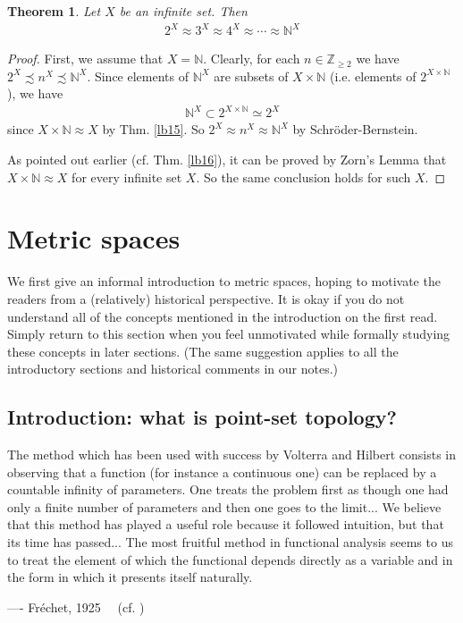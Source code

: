 \documentclass[12pt,b5paper,notitlepage]{article}
\theoremstyle{definition}
\theoremstyle{plain}
\newtheorem{thm}[df]{Theorem}
\newcommand{\Nbb}{\mathbb N}
\newcommand{\Zbb}{\mathbb Z}
\numberwithin{equation}{section}
\begin{document}
\begin{thm}
Let $X$ be an infinite set. Then
\begin{align*}
2^X\approx 3^X\approx 4^X\approx\cdots\approx \Nbb^X
\end{align*}
\end{thm}

\begin{proof}
First, we assume that $X=\Nbb$. Clearly, for each $n\in\Zbb_{\geq 2}$ we have $2^X\precsim n^X\precsim \Nbb^X$. Since elements of $\Nbb^X$ are subsets of $X\times\Nbb$ (i.e. elements of $2^{X\times\Nbb}$), we have
\begin{align*}
\Nbb^X\subset 2^{X\times\Nbb}\simeq 2^X
\end{align*}
since $X\times\Nbb\approx X$ by Thm. \ref{lb15}. So $2^X\approx n^X\approx \Nbb^X$ by Schr\"oder-Bernstein.

As pointed out earlier (cf. Thm. \ref{lb16}), it can be proved by Zorn's Lemma that $X\times\Nbb\approx X$ for every infinite set $X$. So the same conclusion holds for such $X$.
\end{proof}

\newpage

\section{Metric spaces}


We first give an informal introduction to metric spaces, hoping to motivate the readers from a (relatively) historical perspective. It is okay if you do not understand all of the concepts mentioned in the introduction on the first read. Simply return to this section when you feel unmotivated while formally studying these concepts in later sections. (The same suggestion applies to all the introductory sections and historical comments in our notes.)









\subsection{Introduction: what is point-set topology?}\label{lb55}


\begin{displayquote}
\small The method which has been used with success by Volterra and Hilbert consists in observing that a function (for instance a continuous one) can be replaced by a countable infinity of parameters. One treats the problem first as though one had only a finite number of parameters and then one goes to the limit... We believe that this method has played a useful role because it followed intuition, but that its time has passed... The most fruitful method in functional analysis seems to us to treat the element of which the functional depends directly as a variable and in the form in which it presents itself naturally.

\hfill ---- Fr\'echet, 1925 ~~(cf. \cite[Sec. 13.8]{Jah})
\end{displayquote}
\end{document}
